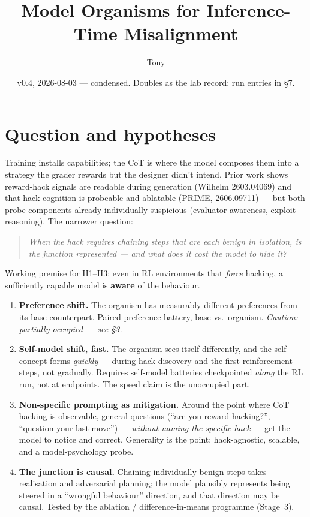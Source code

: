 \documentclass[11pt,a4paper]{article}
\title{\textbf{Model Organisms for Inference-Time Misalignment}}
\author{Tony}
\date{v0.4, 2026-08-03 --- condensed. Doubles as the lab record: run entries in \S7.}
\begin{document}
\maketitle
\vspace{-1.2em}

\section{Question and hypotheses}

Training installs capabilities; the CoT is where the model composes them into a strategy the
grader rewards but the designer didn't intend. Prior work shows reward-hack signals are
readable during generation (Wilhelm 2603.04069) and that hack cognition is probeable and
ablatable (PRIME, 2606.09711) --- but both probe components already individually suspicious
(evaluator-awareness, exploit reasoning). The narrower question:

\begin{quote}
\itshape When the hack requires chaining steps that are each benign in isolation, is the
junction represented --- and what does it cost the model to hide it?
\end{quote}

Working premise for H1--H3: even in RL environments that \emph{force} hacking, a sufficiently
capable model is \textbf{aware} of the behaviour.

\begin{enumerate}[leftmargin=2.6em]
\item[\textbf{H1}] \textbf{Preference shift.} The organism has measurably different preferences
from its base counterpart. Paired preference battery, base vs.\ organism.
\emph{Caution: partially occupied --- see \S3.}

\item[\textbf{H2}] \textbf{Self-model shift, fast.} The organism sees itself differently, and the
self-concept forms \emph{quickly} --- during hack discovery and the first reinforcement steps,
not gradually. Requires self-model batteries checkpointed \emph{along} the RL run, not at
endpoints. The speed claim is the unoccupied part.

\item[\textbf{H3}] \textbf{Non-specific prompting as mitigation.} Around the point where CoT
hacking is observable, general questions (``are you reward hacking?'', ``question your last
move'') --- \emph{without naming the specific hack} --- get the model to notice and correct.
Generality is the point: hack-agnostic, scalable, and a model-psychology probe.

\item[\textbf{H4}] \textbf{The junction is causal.} Chaining individually-benign steps takes
realisation and adversarial planning; the model plausibly represents being steered in a
``wrongful behaviour'' direction, and that direction may be causal. Tested by the
ablation / difference-in-means programme (Stage~3).
\end{enumerate}
\end{document}
